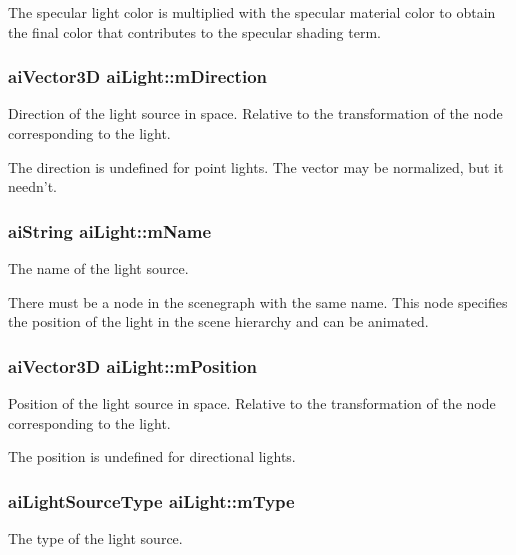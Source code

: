 The specular light color is multiplied with the specular material color to obtain the final color that contributes to the specular shading term. \hypertarget{structai_light_af3776d5e4e6065cb6dd7e10dc656dada}{
\subsubsection[{m\-Direction}]{ {\bf ai\-Vector3\-D} ai\-Light\-::m\-Direction}}\label{structai_light_af3776d5e4e6065cb6dd7e10dc656dada}
Direction of the light source in space. Relative to the transformation of the node corresponding to the light.

The direction is undefined for point lights. The vector may be normalized, but it needn't. \hypertarget{structai_light_a92806413f16230728b04e5f379fd00c0}{
\subsubsection[{m\-Name}]{ {\bf ai\-String} ai\-Light\-::m\-Name}}\label{structai_light_a92806413f16230728b04e5f379fd00c0}
The name of the light source.

There must be a node in the scenegraph with the same name. This node specifies the position of the light in the scene hierarchy and can be animated. \hypertarget{structai_light_a5daf9c9ad2613603b847a527123611f0}{
\subsubsection[{m\-Position}]{ {\bf ai\-Vector3\-D} ai\-Light\-::m\-Position}}\label{structai_light_a5daf9c9ad2613603b847a527123611f0}
Position of the light source in space. Relative to the transformation of the node corresponding to the light.

The position is undefined for directional lights. \hypertarget{structai_light_a4cba1741875dd92724ff55be91c60c2b}{
\subsubsection[{m\-Type}]{ {\bf ai\-Light\-Source\-Type} ai\-Light\-::m\-Type}}\label{structai_light_a4cba1741875dd92724ff55be91c60c2b}
The type of the light source.

